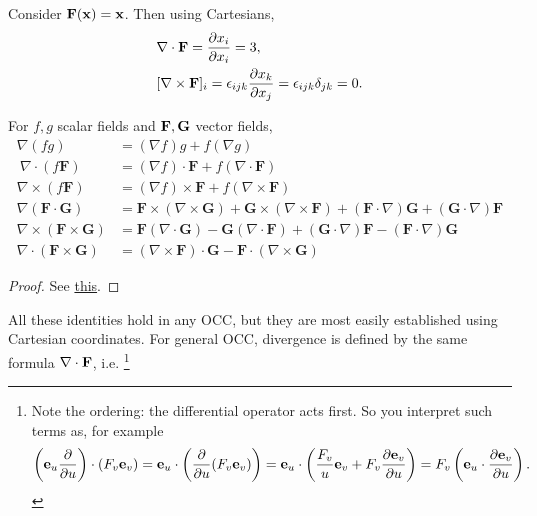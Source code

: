 \begin{example}
    Consider $ {\bf F}({\bf x}) = {\bf x} $. Then using Cartesians, 
    \begin{align*}
        &\nabla\cdot {\bf F}= \frac{\partial x_i}{\partial x_i} = 3,\\ 
        &[\nabla\times {\bf F}]_{i} = \epsilon_{ijk}\frac{\partial x_k}{\partial x_j}=\epsilon_{ijk}\delta_{jk} = 0. \\  
    \end{align*}
\end{example}
\begin{proposition}
    For $f,g$ scalar fields and $ {\bf F},{\bf G} $ vector fields,
    \begin{align*}
      \nabla(fg) &= (\nabla f)g + f(\nabla g)\\\
      \nabla\cdot (f\mathbf{F}) &= (\nabla f)\cdot \mathbf{F} + f(\nabla\cdot \mathbf{F})\\
      \nabla\times (f\mathbf{F}) &= (\nabla f)\times \mathbf{F} + f(\nabla\times \mathbf{F})\\
      \nabla(\mathbf{F}\cdot \mathbf{G}) &= \mathbf{F}\times (\nabla \times \mathbf{G}) + \mathbf{G}\times (\nabla \times \mathbf{F}) + (\mathbf{F}\cdot \nabla)\mathbf{G} + (\mathbf{G}\cdot \nabla) \mathbf{F}\\
      \nabla \times (\mathbf{F}\times \mathbf{G}) &= \mathbf{F}(\nabla\cdot \mathbf{G}) - \mathbf{G}(\nabla\cdot \mathbf{F}) + (\mathbf{G}\cdot \nabla)\mathbf{F} - (\mathbf{F}\cdot \nabla)\mathbf{G}\\
      \nabla\cdot (\mathbf{F}\times \mathbf{G}) &= (\nabla\times \mathbf{F})\cdot \mathbf{G} - \mathbf{F}\cdot (\nabla\times \mathbf{G})
    \end{align*}
\end{proposition}
\begin{proof}
    See \href{https://www.vle.cam.ac.uk/pluginfile.php/19798882/mod_resource/content/9/vc_notes1.pdf#page=32}{this}.
\end{proof}
All these identities hold in any OCC, but they are most easily established using Cartesian coordinates. For general OCC, divergence is defined by the same formula $ \nabla\cdot {\bf F} $, i.e. \footnote{Note the ordering: the differential operator acts first. So you interpret such terms as, for example
\[
    \left( {\bf e}_u \frac{\partial }{\partial u}  \right) \cdot (F_v{\bf e}_v)= {\bf e}_u \cdot \left( \frac{\partial }{\partial u}(F_v{\bf e}_v)  \right) = {\bf e}_u \cdot \left( \frac{F_v}{u}{\bf e}_v+F_v \frac{\partial {\bf e}_v}{\partial u}  \right)=F_v\left( {\bf e}_u \cdot \frac{\partial {\bf e}_v}{\partial u}  \right).
\]}
